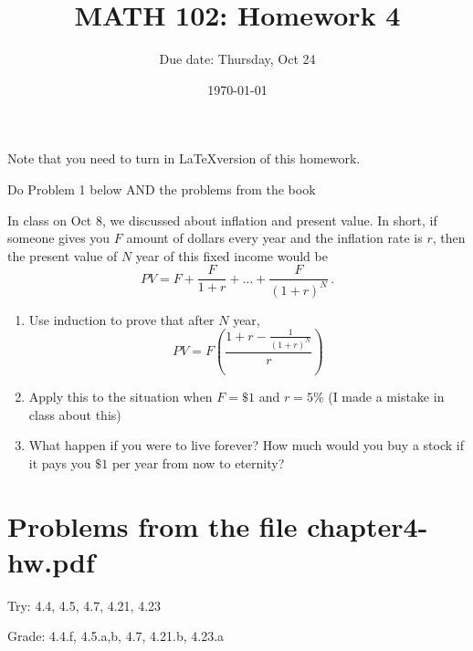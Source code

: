 \documentclass[12pt]{amsart}
\title{ MATH 102: Homework 4}
\author{Due date: Thursday, Oct 24}
\date{\today}
\begin{document}
\maketitle

Note that you need to turn in \LaTeX version of this homework.

Do Problem 1 below AND the problems from the book
\begin{problem}
In class on Oct 8, we discussed about inflation and present value.
In short, if someone gives you $F$ amount of dollars every year
and the inflation rate is $r$, then the present value of $N$ year
of this fixed income would be
\begin{equation*}
	PV = F + \frac{F}{1 + r} + \dots + \frac{F}{(1 + r)^N} \,.
\end{equation*}

\begin{enumerate}
	\item Use induction to prove that after $N$ year,
	      \begin{equation*}
		      PV = F \left(\frac{ 1 + r - \frac{1}{(1+r)^{N}} }{r} \right)
	      \end{equation*}
	\item Apply this to the situation when $F = \$1$ and $r = 5\%$ (I made a mistake in
	      class about this)
	\item What happen if you were to live forever? How much would you buy a stock if
	      it pays you $\$1$ per year from now to eternity?
\end{enumerate}


\end{problem}

\section*{Problems from the file chapter4-hw.pdf}

Try: 4.4, 4.5, 4.7, 4.21, 4.23

Grade: 4.4.f, 4.5.a,b, 4.7, 4.21.b, 4.23.a





%
%
\end{document}
